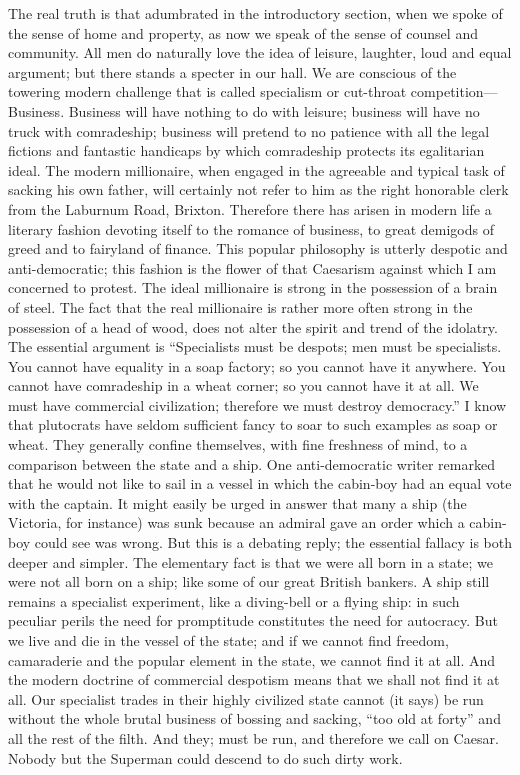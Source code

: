 \documentclass{book}
\begin{document}
The real truth is that adumbrated in the introductory section, when we spoke of the sense of home and property, as now we speak of the sense of counsel and community. All men do naturally love the idea of leisure, laughter, loud and equal argument; but there stands a specter in our hall. We are conscious of the towering modern challenge that is called specialism or cut-throat competition—Business. Business will have nothing to do with leisure; business will have no truck with comradeship; business will pretend to no patience with all the legal fictions and fantastic handicaps by which comradeship protects its egalitarian ideal. The modern millionaire, when engaged in the agreeable and typical task of sacking his own father, will certainly not refer to him as the right honorable clerk from the Laburnum Road, Brixton. Therefore there has arisen in modern life a literary fashion devoting itself to the romance of business, to great demigods of greed and to fairyland of finance. This popular philosophy is utterly despotic and anti-democratic; this fashion is the flower of that Caesarism against which I am concerned to protest. The ideal millionaire is strong in the possession of a brain of steel. The fact that the real millionaire is rather more often strong in the possession of a head of wood, does not alter the spirit and trend of the idolatry. The essential argument is “Specialists must be despots; men must be specialists. You cannot have equality in a soap factory; so you cannot have it anywhere. You cannot have comradeship in a wheat corner; so you cannot have it at all. We must have commercial civilization; therefore we must destroy democracy.” I know that plutocrats have seldom sufficient fancy to soar to such examples as soap or wheat. They generally confine themselves, with fine freshness of mind, to a comparison between the state and a ship. One anti-democratic writer remarked that he would not like to sail in a vessel in which the cabin-boy had an equal vote with the captain. It might easily be urged in answer that many a ship (the Victoria, for instance) was sunk because an admiral gave an order which a cabin-boy could see was wrong. But this is a debating reply; the essential fallacy is both deeper and simpler. The elementary fact is that we were all born in a state; we were not all born on a ship; like some of our great British bankers. A ship still remains a specialist experiment, like a diving-bell or a flying ship: in such peculiar perils the need for promptitude constitutes the need for autocracy. But we live and die in the vessel of the state; and if we cannot find freedom, camaraderie and the popular element in the state, we cannot find it at all. And the modern doctrine of commercial despotism means that we shall not find it at all. Our specialist trades in their highly civilized state cannot (it says) be run without the whole brutal business of bossing and sacking, “too old at forty” and all the rest of the filth. And they; must be run, and therefore we call on Caesar. Nobody but the Superman could descend to do such dirty work.
\end{document}
